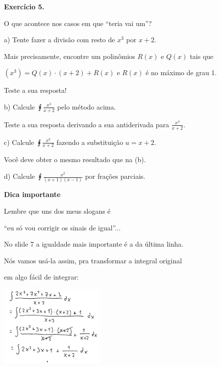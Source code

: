 \documentclass[oneside,12pt]{article}
\begin{document}
\newpage

{\bf Exercício 5.}

\ssk

O que acontece nos casos em que ``teria vai um''?

\ssk

a) Tente fazer a divisão com resto de $x^3$ por $x+2$.

Mais precisamente, encontre um polinômios $R(x)$ e $Q(x)$ tais que

$(x^3) = Q(x) · (x+2) + R(x)$ e $R(x)$ é no máximo de grau 1.

Teste a sua resposta!

\ssk

b) Calcule $\intx{\frac{x^3}{x+2}}$ pelo método acima.

Teste a sua resposta derivando a sua antiderivada para $\frac{x^3}{x+2}$.

\ssk

c) Calcule $\intx{\frac{x^3}{x+2}}$ fazendo a substituição $u=x+2$.

Você deve obter o mesmo resultado que na (b).

\bsk

d) Calcule $\intx{\frac{x^2}{(x+1)(x-1)}}$ por frações parciais.


\newpage

{\bf Dica importante}

\ssk

Lembre que uns dos meus slogans é

``eu só vou corrigir os sinais de igual''...

No slide 7 a igualdade mais importante é a da última linha.

Nós vamos usá-la assim, pra transformar a integral original

em algo fácil de integrar:

\msk

\includegraphics[height=4cm]{2020-1-C2/20201119_C2_div_com_resto_4.pdf}


\newpage
\end{document}

